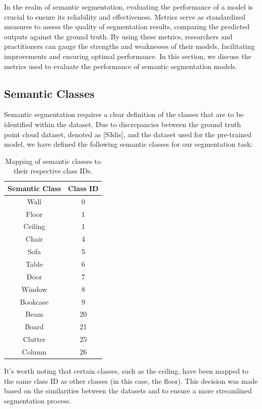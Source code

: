 \documentclass[11pt, a4paper,oneside,chapterprefix=false]{scrbook}
\begin{document}
In the realm of semantic segmentation, evaluating the performance of a model is crucial to ensure its reliability and effectiveness. Metrics serve as standardized measures to assess the quality of segmentation results, comparing the predicted outputs against the ground truth. By using these metrics, researchers and practitioners can gauge the strengths and weaknesses of their models, facilitating improvements and ensuring optimal performance. In this section, we discuss the metrics used to evaluate the performance of semantic segmentation models.

\subsection{Semantic Classes}

Semantic segmentation requires a clear definition of the classes that are to be identified within the dataset. Due to discrepancies between the ground truth point cloud dataset, denoted as [S3dis], and the dataset used for the pre-trained model, we have defined the following semantic classes for our segmentation task:

\begin{table}[h]
    \centering
    \begin{tabular}{|c|c|}
        \hline
        \textbf{Semantic Class} & \textbf{Class ID} \\
        \hline
        Wall & 0 \\
        Floor & 1 \\
        Ceiling & 1 \\
        Chair & 4 \\
        Sofa & 5 \\
        Table & 6 \\
        Door & 7 \\
        Window & 8 \\
        Bookcase & 9 \\
        Beam & 20 \\
        Board & 21 \\
        Clutter & 25 \\
        Column & 26 \\
        \hline
    \end{tabular}
    \caption{Mapping of semantic classes to their respective class IDs.}
    \label{tab:semantic_classes}
\end{table}

It's worth noting that certain classes, such as the ceiling, have been mapped to the same class ID as other classes (in this case, the floor). This decision was made based on the similarities between the datasets and to ensure a more streamlined segmentation process.
\end{document}
